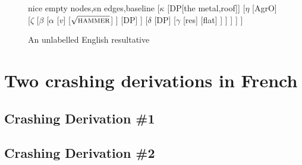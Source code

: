 \documentclass[MilwayThesis]{subfiles}
\begin{document}
	\begin{figure}[h]
		\centering
		{\small
			\begin{forest}
				nice empty nodes,sn edges,baseline
				[$\kappa$
					[DP[the metal,roof]]
					[$\eta$
						[AgrO]
						[$\zeta$
							[$\beta$
								[$\alpha$
									[$v$]
									[$\sqrt{\textsc{hammer}}$]
								]
								[DP]
							]
							[$\delta$
								[DP]
								[$\gamma$
									[res]
									[flat]
								]
							]
						]
					]
				]
			\end{forest}
		}
		\caption{An unlabelled English resultative}
		\label{fig:EngVP}
	\end{figure}
\section{Two crashing derivations in French}

\subsection{Crashing Derivation \#1}

\subsection{Crashing Derivation \#2}
\end{document}
